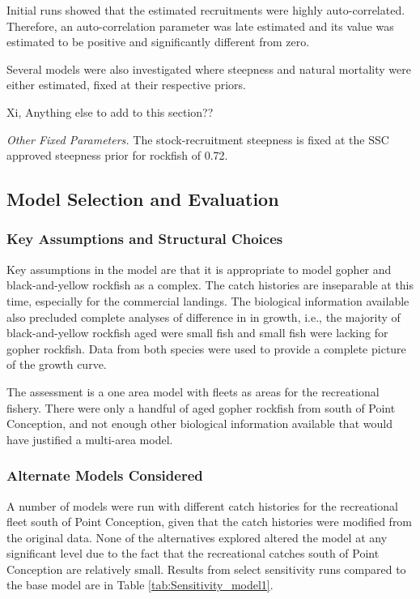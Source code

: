 \documentclass[12pt,]{article}
\begin{document}
Initial runs showed that the estimated recruitments were highly
auto-correlated.\\
Therefore, an auto-correlation parameter was late estimated and its
value was estimated to be positive and significantly different from
zero.

Several models were also investigated where steepness and natural
mortality were either estimated, fixed at their respective priors.

Xi, Anything else to add to this section??

\emph{Other Fixed Parameters.} The stock-recruitment steepness is fixed
at the SSC approved steepness prior for rockfish of 0.72.

\subsection{Model Selection and
Evaluation}\label{model-selection-and-evaluation}

\subsubsection{Key Assumptions and Structural
Choices}\label{key-assumptions-and-structural-choices}

Key assumptions in the model are that it is appropriate to model gopher
and black-and-yellow rockfish as a complex. The catch histories are
inseparable at this time, especially for the commercial landings. The
biological information available also precluded complete analyses of
difference in in growth, i.e., the majority of black-and-yellow rockfish
aged were small fish and small fish were lacking for gopher rockfish.
Data from both species were used to provide a complete picture of the
growth curve.

The assessment is a one area model with fleets as areas for the
recreational fishery. There were only a handful of aged gopher rockfish
from south of Point Conception, and not enough other biological
information available that would have justified a multi-area model.

\subsubsection{Alternate Models
Considered}\label{alternate-models-considered}

A number of models were run with different catch histories for the
recreational fleet south of Point Conception, given that the catch
histories were modified from the original data. None of the alternatives
explored altered the model at any significant level due to the fact that
the recreational catches south of Point Conception are relatively small.
Results from select sensitivity runs compared to the base model are in
Table \ref{tab:Sensitivity_model1}.
\end{document}
